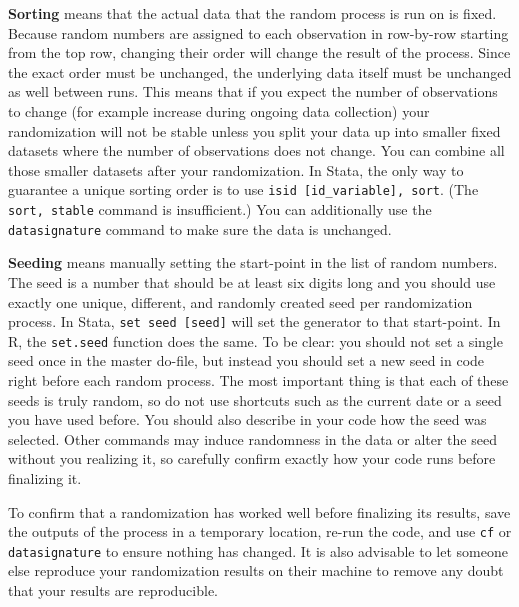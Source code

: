 \textbf{Sorting} means that the actual data that the random process is run on is fixed.
Because random numbers are assigned to each observation in row-by-row starting from
the top row,
changing their order will change the result of the process.
Since the exact order must be unchanged, the underlying data itself must be unchanged as well between runs.
This means that if you expect the number of observations to change (for example increase during
ongoing data collection) your randomization will not be stable unless you split your data up into
smaller fixed datasets where the number of observations does not change. You can combine all
those smaller datasets after your randomization.
In Stata, the only way to guarantee a unique sorting order is to use
\texttt{isid [id\_variable], sort}. (The \texttt{sort, stable} command is insufficient.)
You can additionally use the \texttt{datasignature} command to make sure the
data is unchanged.

\textbf{Seeding} means manually setting the start-point in the list of random numbers.
The seed is a number that should be at least six digits long and you should use exactly
one unique, different, and randomly created seed per randomization process.
In Stata, \texttt{set seed [seed]} will set the generator to that start-point. In R, the \texttt{set.seed} function does the same.
To be clear: you should not set a single seed once in the master do-file,
but instead you should set a new seed in code right before each random process.
The most important thing is that each of these seeds is truly random,
so do not use shortcuts such as the current date or a seed you have used before.
You should also describe in your code how the seed was selected.
Other commands may induce randomness in the data or alter the seed without you realizing it,
so carefully confirm exactly how your code runs before finalizing it.

To confirm that a randomization has worked well before finalizing its results,
save the outputs of the process in a temporary location,
re-run the code, and use \texttt{cf} or \texttt{datasignature} to ensure
nothing has changed. It is also advisable to let someone else reproduce your
randomization results on their machine to remove any doubt that your results
are reproducible.

